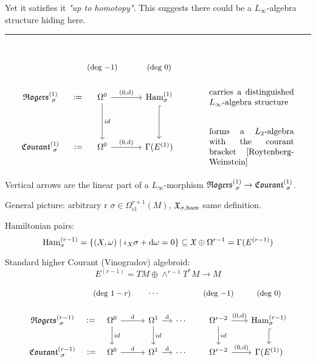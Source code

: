 \documentclass[beamer,10pt]{standalone}
\newcommand{\seprule}{\par\noindent\rule{.4\textwidth}{0.4pt}\\
}
\begin{document}
\begin{frame}
	Yet it satisfies it \emph{"up to homotopy"}. This suggests there could be a $L_\infty$-algebra structure hiding here.
	\vfill

	\seprule
	\begin{displaymath}
		\begin{tikzcd}[ampersand replacement=\&]
			\& \text{\small (deg $-1$)} \& \text{\small (deg $0$)} \\[-.5em]
			\Rogers[\sigma]{1}   \ar[r,phantom,":="]
			\&
			\Omega^0 \ar[r,"{(0,\d)}"] \ar[d,"id"]
			\& \Ham_{\sigma}^{(1)} \ar[d,hook]
			\&[1em] \parbox{10em}{carries a distinguished $L_\infty$-algebra structure}
			\\
			\Courant[\sigma]{1} \ar[r,phantom,":="]
			\& \Omega^0 \ar[r,"{(0,\d)}"]
			\& \Gamma(E^{(1)}) \&
			\parbox{10em}{forms a $L_2$-algebra with the courant bracket [Roytenberg-Weinstein]}
		\end{tikzcd}
	\end{displaymath}
	\vfill

	Vertical arrows are the linear part of a $L_\infty$-morphism $\Rogers[\sigma]{1} \to \Courant[\sigma]{1}$.
\end{frame}

\begin{frame}{General picture: arbitrary r}
	$\sigma \in \Omega^{r+1}_{\mathrm{cl}}(M)$, 
	$\X_{\sigma,\ham}$ same definition.
	\vfill

	Hamiltonian pairs:
	$$
		\Ham^{(r-1)}_\sigma = 
		\{ (X,\omega) \mid \iota_X \sigma + \d \omega  = 0 \}
		\subseteq \X\oplus \Omega^{r-1} = \Gamma(E^{(r-1)})
	$$
	\vfill
	
	Standard higher Courant (Vinogradov) algebroid:
	$$ E^{(r-1)} = TM \oplus \wedge^{r-1} T^* M \to M$$
	\vfill

	\begin{displaymath}
		\begin{tikzcd}[ampersand replacement=\&,column sep = small]
			\& \text{\small (deg $1-r$)} \& \cdots \& \&\text{\small (deg $-1$)} \& \text{\small (deg $0$)} \\[-.5em]
			\Rogers[\sigma]{r-1}   \ar[r,phantom,":="]
			\&
			\Omega^0 \ar[r,"{\d}"] \ar[d,"id"]
			\&
			\Omega^1 \ar[r,"{\d}"] \ar[d,"id"]
			\&
			\cdots
			\&
			\Omega^{r-2} \ar[r,"{(0,\d)}"] \ar[d,"id"]
			\& \Ham_{\sigma}^{(r-1)} \ar[d,hook]
			\\
			\Courant[\sigma]{r-1} \ar[r,phantom,":="]
			\&
			\Omega^0 \ar[r,"{\d}"]
			\&
			\Omega^1 \ar[r,"{\d}"] 
			\&
			\cdots
			\&
			\Omega^{r-2} \ar[r,"{(0,\d)}"]
			\& \Gamma(E^{(1)})
		\end{tikzcd}
	\end{displaymath}

\end{frame}

\begin{frame}

\end{frame}


\end{document}
